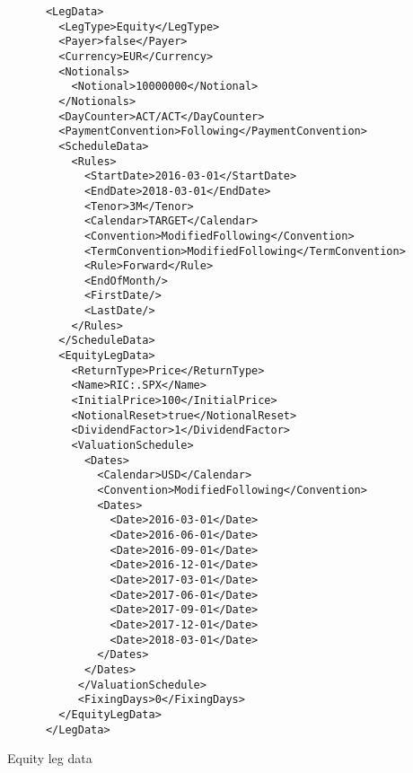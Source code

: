 \begin{listing}[H]
\begin{verbatim}
      <LegData>
        <LegType>Equity</LegType>
        <Payer>false</Payer>
        <Currency>EUR</Currency>
        <Notionals>
          <Notional>10000000</Notional>
        </Notionals>
        <DayCounter>ACT/ACT</DayCounter>
        <PaymentConvention>Following</PaymentConvention>
        <ScheduleData>
          <Rules>
            <StartDate>2016-03-01</StartDate>
            <EndDate>2018-03-01</EndDate>
            <Tenor>3M</Tenor>
            <Calendar>TARGET</Calendar>
            <Convention>ModifiedFollowing</Convention>
            <TermConvention>ModifiedFollowing</TermConvention>
            <Rule>Forward</Rule>
            <EndOfMonth/>
            <FirstDate/>
            <LastDate/>
          </Rules>
        </ScheduleData>
        <EquityLegData>
          <ReturnType>Price</ReturnType>
          <Name>RIC:.SPX</Name>
          <InitialPrice>100</InitialPrice>
          <NotionalReset>true</NotionalReset>
          <DividendFactor>1</DividendFactor>
          <ValuationSchedule>
            <Dates>
              <Calendar>USD</Calendar>
              <Convention>ModifiedFollowing</Convention>
              <Dates>
                <Date>2016-03-01</Date>
                <Date>2016-06-01</Date>
                <Date>2016-09-01</Date>
                <Date>2016-12-01</Date>
                <Date>2017-03-01</Date>
                <Date>2017-06-01</Date>
                <Date>2017-09-01</Date>
                <Date>2017-12-01</Date>
                <Date>2018-03-01</Date>
              </Dates>
            </Dates>
           </ValuationSchedule>
           <FixingDays>0</FixingDays>
        </EquityLegData>
      </LegData>
\end{verbatim}
\caption{Equity leg data}
\label{lst:equitylegdata}
\end{listing}
